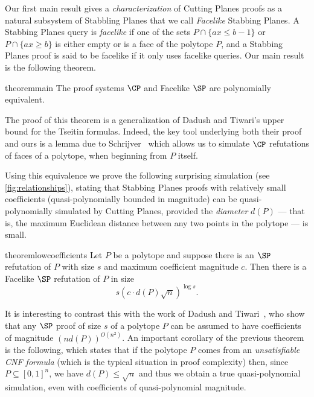 \documentclass[11pt]{article}
\begin{document}
Our first main result gives a \emph{characterization} of Cutting Planes proofs as a natural subsystem of Stabbling Planes that we call \emph{Facelike} Stabbing Planes.
%
A Stabbing Planes query is \emph{facelike} if one of the sets $P \cap \{ax \leq b-1\}$ or $P \cap \{ax \geq b\}$ is either empty or is a face of the polytope $P$, and a Stabbing Planes proof is said to be facelike if it only uses facelike queries. 
Our main result is the following theorem. 

\begin{restatable}{theorem}{main}
	\label{thm:main}
	The proof systems $\CP$ and Facelike $\SP$ are polynomially equivalent.
\end{restatable}

The proof of this theorem is a generalization of Dadush and Tiwari's upper bound for the Tseitin formulas. Indeed, the key tool underlying both their proof and ours is a lemma due to Schrijver~\cite{SCHRIJVER1980291} which allows us to simulate $\CP$ refutations of faces of a polytope, when beginning from $P$ itself.

Using this equivalence we prove the following surprising simulation (see \autoref{fig:relationships}), stating that Stabbing Planes proofs with relatively small coefficients (quasi-polynomially bounded in magnitude) can be quasi-polynomially simulated by Cutting Planes, provided the \emph{diameter} $d(P)$ --- that is, the maximum Euclidean distance between any two points in the polytope --- is small.


\begin{restatable}{theorem}{lowcoefficients}
	\label{thm:low-coefficients}
	Let $P$ be a polytope and suppose there is an $\SP$ refutation of $P$ with size $s$ and maximum coefficient magnitude $c$. 
	Then there is a Facelike $\SP$ refutation of $P$ in size 
	\[ s (c \cdot d(P) \sqrt{n})^{\log s}. \]	
\end{restatable}


It is interesting to contrast this with the work of Dadush and Tiwari~\cite{TseitinUpperBound}, who show that any $\SP$ proof of size $s$ of a polytope $P$ can be assumed to have coefficients of magnitude $(nd(P))^{O(n^2)}$.
An important corollary of the previous theorem is the following, which states that if the polytope $P$ comes from an \emph{unsatisfiable CNF formula} (which is the typical situation in proof complexity) then, since $P \subseteq [0,1]^n$, we have $d(P) \leq \sqrt{n}$ and thus we obtain a true quasi-polynomial simulation, even with coefficients of quasi-polynomial magnitude.
\end{document}

